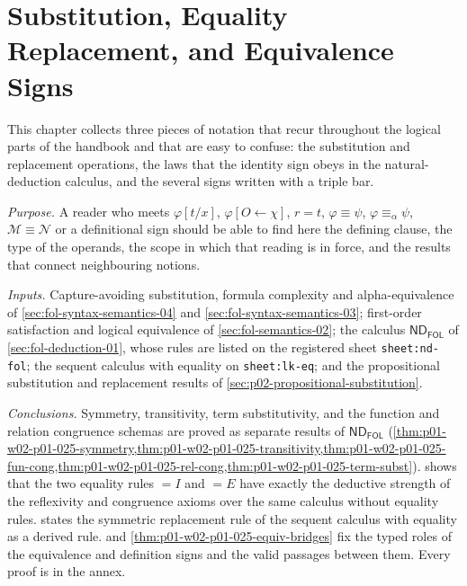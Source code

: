 \chapter{Substitution, Equality Replacement, and Equivalence Signs}
\label{sec:p01-w02-p01-025-overview}

This chapter collects three pieces of notation that recur throughout the
logical parts of the handbook and that are easy to confuse: the substitution
and replacement operations, the laws that the identity sign obeys in the
natural-deduction calculus, and the several signs written with a triple bar.

\emph{Purpose.}  A reader who meets \(\varphi[t/x]\),
\(\varphi[O\leftarrow\chi]\), \(r=t\), \(\varphi\equiv\psi\),
\(\varphi\equiv_\alpha\psi\), \(\mathcal M\equiv\mathcal N\) or a
definitional sign should be able to find here the defining clause, the type
of the operands, the scope in which that reading is in force, and the
results that connect neighbouring notions.

\emph{Inputs.}  Capture-avoiding substitution, formula complexity and
alpha-equivalence of \cref{sec:fol-syntax-semantics-04} and
\cref{sec:fol-syntax-semantics-03}; first-order satisfaction and logical
equivalence of \cref{sec:fol-semantics-02}; the calculus
\(\mathsf{ND}_{\mathsf{FOL}}\) of \cref{sec:fol-deduction-01}, whose rules
are listed on the registered sheet \texttt{sheet:nd-fol}; the sequent
calculus with equality on \texttt{sheet:lk-eq}; and
the propositional substitution and replacement results of
\cref{sec:p02-propositional-substitution}.

\emph{Conclusions.}  Symmetry, transitivity, term substitutivity, and the
function and relation congruence schemas are proved as separate results of
\(\mathsf{ND}_{\mathsf{FOL}}\)
(\cref{thm:p01-w02-p01-025-symmetry,thm:p01-w02-p01-025-transitivity,thm:p01-w02-p01-025-fun-cong,thm:p01-w02-p01-025-rel-cong,thm:p01-w02-p01-025-term-subst}).
 shows that the two equality
rules \(=I\) and \(=E\) have exactly the deductive strength of the
reflexivity and congruence axioms over the same calculus without equality
rules.   states the symmetric
replacement rule of the sequent calculus with equality as a derived rule.
 and
\cref{thm:p01-w02-p01-025-equiv-bridges} fix the typed roles of the
equivalence and definition signs and the valid passages between them.
Every proof is in the annex.

